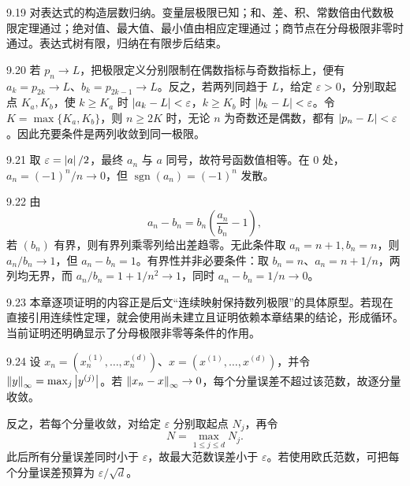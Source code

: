 \begin{solution}{9.19}
对表达式的构造层数归纳。变量层极限已知；和、差、积、常数倍由代数极限定理通过；绝对值、最大值、最小值由相应定理通过；商节点在分母极限非零时通过。表达式树有限，归纳在有限步后结束。
\end{solution}

\begin{solution}{9.20}
若 \(p_n\to L\)，把极限定义分别限制在偶数指标与奇数指标上，便有 \(a_k=p_{2k}\to L\)、\(b_k=p_{2k-1}\to L\)。反之，若两列同趋于 \(L\)，给定 \(\varepsilon>0\)，分别取起点 \(K_a,K_b\)，使 \(k\ge K_a\) 时 \(\left|a_k-L\right|<\varepsilon\)，\(k\ge K_b\) 时 \(\left|b_k-L\right|<\varepsilon\)。令 \(K=\max\{K_a,K_b\}\)，则 \(n\ge2K\) 时，无论 \(n\) 为奇数还是偶数，都有 \(\left|p_n-L\right|<\varepsilon\)。因此充要条件是两列收敛到同一极限。
\end{solution}

\begin{solution}{9.21}
取 \(\varepsilon=\left|a\right|/2\)，最终 \(a_n\) 与 \(a\) 同号，故符号函数值相等。在 \(0\) 处，\(a_n=(-1)^n/n\to0\)，但
\(\operatorname{sgn}(a_n)=(-1)^n\) 发散。
\end{solution}

\begin{solution}{9.22}
由
\[
 a_n-b_n=b_n\left(\frac{a_n}{b_n}-1\right),
\]
若 \((b_n)\) 有界，则有界列乘零列给出差趋零。无此条件取
\(a_n=n+1,b_n=n\)，则 \(a_n/b_n\to1\)，但 \(a_n-b_n=1\)。有界性并非必要条件：取 \(b_n=n\)、\(a_n=n+1/n\)，两列均无界，而 \(a_n/b_n=1+1/n^2\to1\)，同时 \(a_n-b_n=1/n\to0\)。
\end{solution}

\begin{solution}{9.23}
本章逐项证明的内容正是后文“连续映射保持数列极限”的具体原型。若现在直接引用连续性定理，就会使用尚未建立且证明依赖本章结果的结论，形成循环。当前证明还明确显示了分母极限非零等条件的作用。
\end{solution}

\begin{solution}{9.24}
设 \(x_n=(x_n^{(1)},\ldots,x_n^{(d)})\)、\(x=(x^{(1)},\ldots,x^{(d)})\)，并令
\(\left\lVert y\right\rVert_\infty=\max_j\left|y^{(j)}\right|\)。若
\(\left\lVert x_n-x\right\rVert_\infty\to0\)，每个分量误差不超过该范数，故逐分量收敛。

反之，若每个分量收敛，对给定 \(\varepsilon\) 分别取起点 \(N_j\)，再令
\[
 N=\max_{1\le j\le d}N_j.
\]
此后所有分量误差同时小于 \(\varepsilon\)，故最大范数误差小于 \(\varepsilon\)。若使用欧氏范数，可把每个分量误差预算为 \(\varepsilon/\sqrt d\)。
\end{solution}
